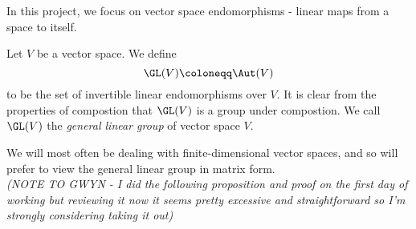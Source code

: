 \documentclass[../Project.tex]{subfiles}
\begin{document}
In this project, we focus on vector space endomorphisms - linear maps from a space to itself.

\begin{defi}
	Let $V$ be a vector space. We define
	$$\GL(V) \coloneqq \Aut(V)$$
	to be the set of invertible linear endomorphisms over $V$. It is clear from the properties of compostion that $\GL(V)$ is a group under compostion. We call $\GL(V)$ the \textit{general linear group} of vector space $V$.\label{1}
\end{defi}

We will most often be dealing with finite-dimensional vector spaces, and so will prefer to view the general linear group in matrix form.\\

\textit{(NOTE TO GWYN - I did the following proposition and proof on the first day of working but reviewing it now it seems pretty excessive and straightforward so I'm strongly considering taking it out)}
\end{document}
